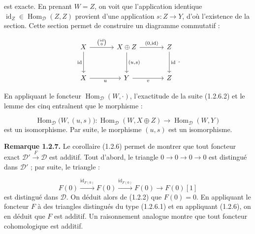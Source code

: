 \clearpage
{}%
\begingroup
\small
\setlength{\abovedisplayskip}{4pt plus 2pt minus 2pt}%
\setlength{\belowdisplayskip}{4pt plus 2pt minus 2pt}%

est exacte. En prenant $W=Z$, on voit que l'application identique
$\operatorname{id}_Z\in\operatorname{Hom}_{\mathcal D}(Z,Z)$ provient d'une
application $s\colon Z\longrightarrow Y$, d'où l'existence de la section.
Cette section permet de construire un diagramme commutatif :

\begin{equation*}
  \begin{tikzcd}[column sep=3.5em,row sep=3.0em]
    X \arrow[r,"{\binom{\operatorname{id}}{0}}"]
      \arrow[d,"{\operatorname{id}}"']
      & X\oplus Z \arrow[r,"{(0,\operatorname{id})}"]
        \arrow[d,"{(u,s)}"]
      & Z \arrow[d,"{\operatorname{id}}"] \\
    X \arrow[r,"u"'] & Y \arrow[r,"v"'] & Z
  \end{tikzcd}\,.
\end{equation*}

En appliquant le foncteur $\operatorname{Hom}_{\mathcal D}(W,\mathord\cdot)$,
l'exactitude de la suite (1.2.6.2) et le lemme des cinq entraînent que le
morphisme :

\[
  \operatorname{Hom}_{\mathcal D}\bigl(W,(u,s)\bigr)\colon
  \operatorname{Hom}_{\mathcal D}(W,X\oplus Z)
  \longrightarrow \operatorname{Hom}_{\mathcal D}(W,Y)
\]
est un isomorphisme. Par suite, le morphisme $(u,s)$ est un isomorphisme.

\medskip
\noindent\textbf{Remarque 1.2.7.}\quad
Le corollaire (1.2.6) permet de montrer que tout foncteur exact
$\mathcal D'\xrightarrow{F}\mathcal D$ est additif. Tout d'abord, le triangle
$0\longrightarrow0\longrightarrow0\longrightarrow0$ est distingué dans
$\mathcal D'$ ; par suite, le triangle :

\[
  F(0)\xrightarrow{\operatorname{id}_{F(0)}}F(0)
  \xrightarrow{\operatorname{id}_{F(0)}}F(0)
  \longrightarrow F(0)[1]
\]
est distingué dans $\mathcal D$. On déduit alors de (1.2.2) que $F(0)=0$.
En appliquant le foncteur $F$ à des triangles distingués du type (1.2.6.1)
et en appliquant (1.2.6), on en déduit que $F$ est additif. Un raisonnement
analogue montre que tout foncteur cohomologique est additif.

